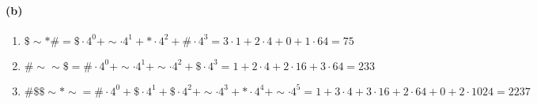 \documentclass[a4paper]{article}
\begin{document}
\paragraph{(b)}

\begin{enumerate}
	\item $ \$ \sim *\# = \$\cdot 4^0 + \sim\cdot4^1 + *\cdot 4^2 + \#\cdot4^3 = 3\cdot1 + 2\cdot 4  + 0 + 1\cdot64 = 75$ 
	\item $ \#\sim\sim\$ = \#\cdot4^0 + \sim\cdot4^1 + \sim\cdot4^2 + \$\cdot4^3 = 1 + 2\cdot4 + 2\cdot16 + 3\cdot64 = 233$
	\item $ \#\$\$\sim * \sim = \#\cdot4^0 + \$\cdot 4^1 + \$\cdot 4^2 + \sim\cdot4^3 + *\cdot4^4 + \sim\cdot4^5 = 1 + 3\cdot4 + 3\cdot16 + 2\cdot64 + 0 + 2\cdot1024 = 2237$	
\end{enumerate}
      
\end{document}
